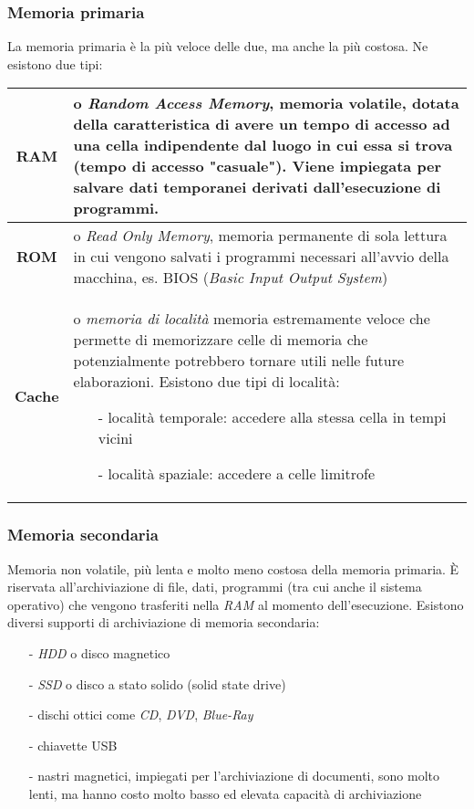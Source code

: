\documentclass{article}
\begin{document}
\subsubsection*{Memoria primaria}
La memoria primaria è la più veloce delle due, ma anche la più costosa. Ne esistono due tipi:
\begin{center}
	\begin{tabularx}{\textwidth}{c X}
		\textbf{RAM} & o \textit{Random Access Memory}, memoria volatile, dotata della caratteristica di avere un tempo di accesso
		ad una cella indipendente dal luogo in cui essa si trova (tempo di accesso "casuale"). Viene impiegata per salvare dati 
		temporanei derivati dall'esecuzione di programmi. \\
		\midrule
		\textbf{ROM} & o \textit{Read Only Memory}, memoria permanente di sola lettura in cui vengono salvati i programmi necessari
		all'avvio della macchina, es. BIOS (\textit{Basic Input Output System}) \\
		\midrule
		\textbf{Cache} & o \textit{memoria di località} memoria estremamente veloce che permette di memorizzare celle di memoria che
		potenzialmente potrebbero tornare utili nelle future elaborazioni. Esistono due tipi di località:
		\begin{itemize}[topsep=3pt, itemsep=0pt]
			\item[-] località temporale: accedere alla stessa cella in tempi vicini
			\item[-] località spaziale: accedere a celle limitrofe
		\end{itemize}
	\end{tabularx}
\end{center}

\subsubsection*{Memoria secondaria}
Memoria non volatile, più lenta e molto meno costosa della memoria primaria. È riservata all'archiviazione di file, dati,
programmi (tra cui anche il sistema operativo) che vengono trasferiti nella \textit{RAM} al momento dell'esecuzione.
Esistono diversi supporti di archiviazione di memoria secondaria:
\begin{itemize} [topsep=3pt, itemsep=0pt, leftmargin=5pt]
	\item[-] \textit{HDD} o disco magnetico
	\item[-] \textit{SSD} o disco a stato solido (solid state drive)
	\item[-] dischi ottici come \textit{CD}, \textit{DVD}, \textit{Blue-Ray}
	\item[-] chiavette USB
	\item[-] nastri magnetici, impiegati per l'archiviazione di documenti, sono molto lenti, ma hanno costo molto basso ed
	elevata capacità di archiviazione
\end{itemize}
\end{document}
